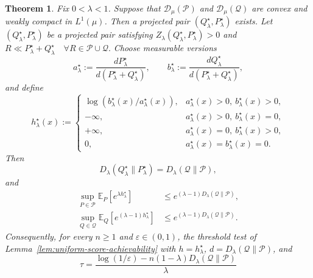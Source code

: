 \documentclass[journal,12pt,draftclsnofoot,onecolumn]{IEEEtran}
\newtheorem{theorem}{Theorem}
\begin{document}
\begin{theorem}
\label{thm:projected-finite-blocklength-achievability} Fix $0<\lambda<1$. Suppose that $\mathcal D_\mu(\mathcal P)$ and $\mathcal D_\mu(\mathcal Q)$ are convex and weakly compact in $L^1(\mu)$. Then a projected pair $(Q_\lambda^\star,P_\lambda^\star)$ exists. Let $(Q_\lambda^\star,P_\lambda^\star)$ be a projected pair satisfying $Z_\lambda(Q_\lambda^\star,P_\lambda^\star)>0$ and $R\ll P_\lambda^\star+Q_\lambda^\star
\quad \forall R\in\mathcal P\cup\mathcal Q.$ Choose measurable versions
\begin{equation*}
a_\lambda^\star:=\frac{dP_\lambda^\star}{d(P_\lambda^\star+Q_\lambda^\star)}, \qquad b_\lambda^\star :=\frac{dQ_\lambda^\star}{d(P_\lambda^\star+Q_\lambda^\star)},
\end{equation*}
and define
\begin{equation*}
h_\lambda^\star(x):=\begin{cases}
\log\!\left(b_\lambda^\star(x)/a_\lambda^\star(x)
\right),
& a_\lambda^\star(x)>0,\ b_\lambda^\star(x)>0,\\
-\infty, & a_\lambda^\star(x)>0,\ b_\lambda^\star(x)=0, \\
+\infty, & a_\lambda^\star(x)=0,\ b_\lambda^\star(x)>0, \\
0, & a_\lambda^\star(x)=b_\lambda^\star(x)=0.
\end{cases}
\end{equation*}
Then
\begin{equation*}
D_\lambda(Q_\lambda^\star\|P_\lambda^\star) = D_\lambda(\mathcal Q\|\mathcal P),
\end{equation*}
and
\begin{equation*}
\begin{aligned}
\sup_{P\in\mathcal P} \mathbb E_P \left[e^{\lambda h_\lambda^\star} \right]&\leq e^{(\lambda-1)D_\lambda(\mathcal Q\|\mathcal P)}, \\ \sup_{Q\in\mathcal Q} \mathbb E_Q \left[ e^{(\lambda-1)h_\lambda^\star}\right] &\leq e^{(\lambda-1)D_\lambda(\mathcal Q\|\mathcal P)}.
\end{aligned}
\end{equation*}
Consequently, for every $n\geq1$ and $\varepsilon\in(0,1)$, the threshold test of Lemma~\ref{lem:uniform-score-achievability} with $h=h_\lambda^\star$, $d=D_\lambda(\mathcal Q\|\mathcal P)$, and
\begin{equation*}
\tau = \frac{ \log(1/\varepsilon) -n(1-\lambda)D_\lambda(\mathcal Q\|\mathcal P) }{\lambda
}
\end{equation*}
\end{theorem}
\end{document}
